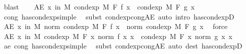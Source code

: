 \begin{isabellebody}
\ blast\isanewline
\ \ \isamarkupfalse%
\ {\isachardoublequoteopen}AE\ x\ in\ M{\isachardot}{\kern0pt}\ cond{\isacharunderscore}{\kern0pt}exp\ M\ F\ f\ x\ {\isacharequal}{\kern0pt}\ cond{\isacharunderscore}{\kern0pt}exp\ M\ F\ g\ x{\isachardoublequoteclose}\ \isamarkupfalse%
\ cong\ has{\isacharunderscore}{\kern0pt}cond{\isacharunderscore}{\kern0pt}exp{\isacharunderscore}{\kern0pt}simple\ \isamarkupfalse%
\ {\isacharparenleft}{\kern0pt}subst\ cond{\isacharunderscore}{\kern0pt}exp{\isacharunderscore}{\kern0pt}cong{\isacharunderscore}{\kern0pt}AE{\isacharparenright}{\kern0pt}\ {\isacharparenleft}{\kern0pt}auto\ intro{\isacharbang}{\kern0pt}{\isacharcolon}{\kern0pt}\ has{\isacharunderscore}{\kern0pt}cond{\isacharunderscore}{\kern0pt}expD{\isacharparenleft}{\kern0pt}{}{\isacharparenright}{\kern0pt}{\isacharparenright}{\kern0pt}\isanewline
\ \ \isamarkupfalse%
\ {\isachardoublequoteopen}AE\ x\ in\ M{\isachardot}{\kern0pt}\ norm\ {\isacharparenleft}{\kern0pt}cond{\isacharunderscore}{\kern0pt}exp\ M\ F\ f\ x{\isacharparenright}{\kern0pt}\ {\isacharequal}{\kern0pt}\ norm\ {\isacharparenleft}{\kern0pt}cond{\isacharunderscore}{\kern0pt}exp\ M\ F\ g\ x{\isacharparenright}{\kern0pt}{\isachardoublequoteclose}\ \isamarkupfalse%
\ force\isanewline
\ \ \isamarkupfalse%
\ \isamarkupfalse%
\ {\isachardoublequoteopen}AE\ x\ in\ M{\isachardot}{\kern0pt}\ cond{\isacharunderscore}{\kern0pt}exp\ M\ F\ {\isacharparenleft}{\kern0pt}{\isasymlambda}x{\isachardot}{\kern0pt}\ norm\ {\isacharparenleft}{\kern0pt}f\ x{\isacharparenright}{\kern0pt}{\isacharparenright}{\kern0pt}\ x\ {\isacharequal}{\kern0pt}\ cond{\isacharunderscore}{\kern0pt}exp\ M\ F\ {\isacharparenleft}{\kern0pt}{\isasymlambda}x{\isachardot}{\kern0pt}\ norm\ {\isacharparenleft}{\kern0pt}g\ x{\isacharparenright}{\kern0pt}{\isacharparenright}{\kern0pt}\ x{\isachardoublequoteclose}\ \ \isamarkupfalse%
\ ae\ cong\ has{\isacharunderscore}{\kern0pt}cond{\isacharunderscore}{\kern0pt}exp{\isacharunderscore}{\kern0pt}simple\ \isamarkupfalse%
\ {\isacharparenleft}{\kern0pt}subst\ cond{\isacharunderscore}{\kern0pt}exp{\isacharunderscore}{\kern0pt}cong{\isacharunderscore}{\kern0pt}AE{\isacharparenright}{\kern0pt}\ {\isacharparenleft}{\kern0pt}auto\ dest{\isacharcolon}{\kern0pt}\ has{\isacharunderscore}{\kern0pt}cond{\isacharunderscore}{\kern0pt}expD{\isacharparenright}{\kern0pt}\isanewline
\ \ \isamarkupfalse%
\ \isamarkupfalse%

\end{isabellebody}
